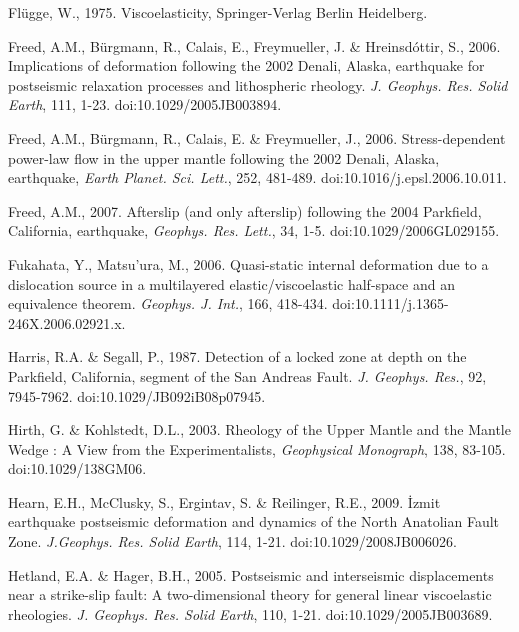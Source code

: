 \documentclass[extra,mreferee]{gji}
\begin{document}
\begin{thebibliography}{}
 Fl\"ugge,
  W., 1975. Viscoelasticity, Springer-Verlag Berlin Heidelberg.

 Freed, A.M., B\"urgmann,
  R., Calais, E., Freymueller, J. \& Hreinsd\'ottir, S.,
  2006. Implications of deformation following the 2002 Denali, Alaska,
  earthquake for postseismic relaxation processes and lithospheric
  rheology. \textit{J. Geophys. Res. Solid Earth}, 111,
  1-23. doi:10.1029/2005JB003894.

 Freed, A.M.,
  B\"urgmann, R., Calais, E. \& Freymueller, J.,
  2006. Stress-dependent power-law flow in the upper mantle following
  the 2002 Denali, Alaska, earthquake, \textit{Earth
    Planet. Sci. Lett.}, 252, 481-489. doi:10.1016/j.epsl.2006.10.011.

 Freed, A.M., 2007. Afterslip
  (and only afterslip) following the 2004 Parkfield, California,
  earthquake, \textit{Geophys. Res. Lett.}, 34,
  1-5. doi:10.1029/2006GL029155.

 Fukahata, Y.,
  Matsu’ura, M., 2006. Quasi-static internal deformation due to a
  dislocation source in a multilayered elastic/viscoelastic half-space
  and an equivalence theorem. \textit{Geophys. J. Int.}, 166,
  418-434. doi:10.1111/j.1365-246X.2006.02921.x.

 Harris, R.A. \&
  Segall, P., 1987. Detection of a locked zone at depth on the
  Parkfield, California, segment of the San Andreas
  Fault. \textit{J. Geophys. Res.}, 92,
  7945-7962. doi:10.1029/JB092iB08p07945.

 Hirth, G. \& Kohlstedt,
  D.L., 2003. Rheology of the Upper Mantle and the Mantle Wedge : A
  View from the Experimentalists, \textit{Geophysical Monograph}, 138,
  83-105. doi:10.1029/138GM06.

 Hearn, E.H., McClusky, S.,
  Ergintav, S. \& Reilinger, R.E., 2009. \.Izmit earthquake
  postseismic deformation and dynamics of the North Anatolian Fault
  Zone. \textit{J.Geophys. Res. Solid Earth}, 114,
  1-21. doi:10.1029/2008JB006026.

 Hetland, E.A. \& Hager,
  B.H., 2005. Postseismic and interseismic displacements near a
  strike-slip fault: A two-dimensional theory for general linear
  viscoelastic rheologies. \textit{J. Geophys. Res. Solid Earth}, 110,
  1-21. doi:10.1029/2005JB003689.


\end{thebibliography}
\end{document}
